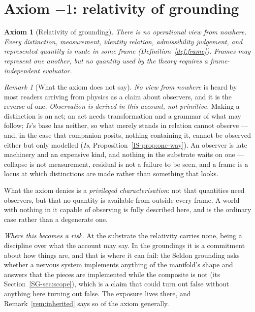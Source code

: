 \documentclass[11pt,a4paper]{article}
\newtheorem{axiom}{Axiom}
\theoremstyle{remark}\newtheorem{remark}[definition]{Remark}
\begin{document}
\section{Axiom \texorpdfstring{$-1$}{-1}: relativity of grounding}\label{sec:axiom-minus-one}
\setcounter{axiom}{-2}
\begin{axiom}[Relativity of grounding]\label{ax:no-view}
There is no operational view from nowhere. Every distinction, measurement, identity relation, admissibility judgement, and represented quantity is made in some frame (Definition~\ref{def:frame}). Frames may represent one another, but no quantity used by the theory requires a frame-independent evaluator.
\end{axiom}
\setcounter{axiom}{0}
\begin{remark}[What the axiom does not say]\label{rem:not-observer-talk}
\emph{No view from nowhere} is heard by most readers arriving from physics as a claim about observers,
and it is the reverse of one. \emph{Observation is derived in this account, not primitive.} Making a
distinction is an act; an act needs transformation and a grammar of what may follow; \emph{Is}'s
base has neither, so what merely stands in relation cannot observe --- and, in the case that companion
posits, nothing containing it, cannot be observed either but only modelled (\emph{Is},
Proposition~\ref{IS-prop:one-way}). An observer is late machinery and an expensive kind, and nothing in the substrate
waits on one --- collapse is not measurement, residual is not a failure to be seen, and a frame is a
locus at which distinctions are made rather than something that looks.

What the axiom denies is a \emph{privileged characterisation}: not that quantities need observers, but
that no quantity is available from outside every frame. A world with nothing in it capable of observing
is fully described here, and is the ordinary case rather than a degenerate one.

\emph{Where this becomes a risk.} At the substrate the relativity carries none, being a discipline over
what the account may say. In the groundings it is a commitment about how things are, and that is where
it can fail: the Seldon grounding asks whether a nervous system implements anything of the manifold's
shape and answers that the pieces are implemented while the composite is not
(its Section~\ref{SG-sec:scope}), which is a claim that could turn out false without anything here
turning out false. The exposure lives there, and Remark~\ref{rem:inherited} says so of the axiom generally.
\end{remark}
\end{document}
